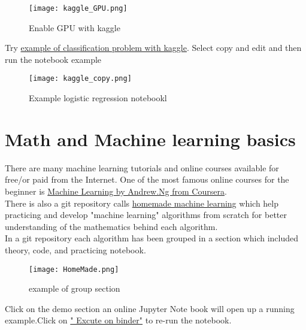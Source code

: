 \documentclass[a4paper,10pt]{article}
\begin{document}
\begin{figure}[H]
\centering
\texttt{[image: kaggle\_GPU.png]}
\caption[Short title]{Enable GPU with kaggle}
\label{fig:ff1}\end{figure}

\newpage
Try \href{https://www.kaggle.com/trungnguyen0987/simple-logistic-regression-with-pytorch}{example of classification problem with kaggle}. Select copy and edit and then run the notebook example  

\begin{figure}[H]
\centering
\texttt{[image: kaggle\_copy.png]}
\caption[Short title]{Example logistic regression notebookl}
\label{fig:ff1}\end{figure}






\section{Math and Machine learning basics}
\label{sec:start}

\hspace{4ex} There are many machine learning tutorials and online courses available for free/or paid from the Internet. One of the most famous online courses for the beginner is \href{https://www.coursera.org/learn/machine-learning}{Machine Learning by Andrew.Ng from Coursera}.\\
There is also a git repository calls \href{https://github.com/trekhleb/homemade-machine-learning}{homemade machine learning} which help practicing and develop "machine learning" algorithms from scratch for better understanding of the mathematics behind each algorithm.\\  
In a git repository each algorithm has been grouped in a section which included theory, code, and practicing notebook. 

\begin{figure}[H]
\centering\texttt{[image: HomeMade.png]}
\caption[Short title]{example of group section}
\label{fig:ff7}\end{figure}

\vspace{5mm}
Click on the demo section an online Jupyter Note book will open up a running example.Click on \href{https://mybinder.org/v2/gh/trekhleb/homemade-machine-learning/master?filepath=notebooks/linear_regression/univariate_linear_regression_demo.ipynb}{" Excute on binder"} to re-run the notebook.  
\end{document}
